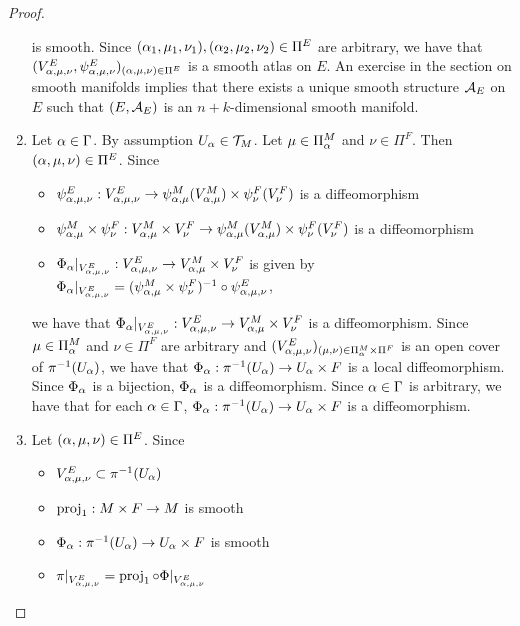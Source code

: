 \documentclass{book}
\begin{document}
\begin{proof}
\begin{enumerate}
			is smooth. Since $(\alpha_1, \mu_1, \nu_1), (\alpha_2, \mu_2, \nu_2) \in \Pi^E$ are arbitrary, we have that $(V^E_{\alpha, \mu, \nu}, \psi^E_{\alpha, \mu, \nu})_{(\alpha, \mu, \nu) \in \Pi^E}$ is a smooth atlas on $E$. An exercise in the section on smooth manifolds implies that there exists a unique smooth structure $\mathcal{A}_E$ on $E$ such that  $(E, \mathcal{A}_E)$ is an $n+k$-dimensional smooth manifold. 
			\item Let $\alpha \in \Gamma$. By assumption $U_{\alpha} \in \mathcal{T}_M$. Let $\mu \in \Pi^M_{\alpha}$ and $\nu \in \Pi^F$. Then $(\alpha, \mu, \nu) \in \Pi^E$. Since 
			\begin{itemize}
				\item $\psi^E_{\alpha, \mu, \nu}: V^E_{\alpha, \mu, \nu} \rightarrow \psi^M_{\alpha, \mu}(V^M_{\alpha, \mu}) \times \psi^F_{\nu}(V^F_{\nu})$ is a diffeomorphism
				\item $\psi^M_{\alpha, \mu} \times \psi^F_{\nu}: V^M_{\alpha, \mu} \times V^F_{\nu} \rightarrow \psi^M_{\alpha, \mu}(V^M_{\alpha, \mu}) \times \psi^F_{\nu}(V^F_{\nu})$ is a diffeomorphism  
				\item $\Phi_{\alpha}|_{V^E_{\alpha, \mu, \nu}}: V^E_{\alpha, \mu, \nu} \rightarrow V^M_{\alpha, \mu} \times V^F_{\nu}$ is given by 
				$\Phi_{\alpha}|_{V^E_{\alpha, \mu, \nu}} =  (\psi^M_{\alpha, \mu} \times \psi^F_{\nu})^{-1} \circ \psi^E_{\alpha, \mu, \nu}$,
			\end{itemize}
			we have that $\Phi_{\alpha}|_{V^E_{\alpha, \mu, \nu}}: V^E_{\alpha, \mu, \nu} \rightarrow V^M_{\alpha, \mu} \times V^F_{\nu}$ is a diffeomorphism. Since $\mu \in \Pi^M_{\alpha}$ and $\nu \in \Pi^F$ are arbitrary and $(V^E_{\alpha, \mu, \nu})_{(\mu, \nu) \in \Pi^M_{\alpha} \times \Pi^F}$ is an open cover of $\pi^{-1}(U_{\alpha})$, we have that $\Phi_{\alpha}: \pi^{-1}(U_{\alpha}) \rightarrow U_{\alpha} \times F$ is a local diffeomorphism. Since $\Phi_{\alpha}$ is a bijection, $\Phi_{\alpha}$ is a diffeomorphism. Since $\alpha \in \Gamma$ is arbitrary, we have that for each $\alpha \in \Gamma$, $\Phi_{\alpha}: \pi^{-1}(U_{\alpha}) \rightarrow U_{\alpha} \times F$ is a diffeomorphism.
			\item Let $(\alpha, \mu, \nu) \in \Pi^E$. Since 
			\begin{itemize}
				\item $V^E_{\alpha, \mu, \nu} \subset \pi^{-1}(U_{\alpha})$
				\item $\operatorname{\text{proj}}_1: M \times F \rightarrow M$ is smooth
				\item $\Phi_{\alpha}: \pi^{-1}(U_{\alpha}) \rightarrow U_{\alpha} \times F$ is smooth
				\item $\pi|_{V^E_{\alpha, \mu, \nu}} = \operatorname{\text{proj}}_1 \circ \Phi|_{V^E_{\alpha, \mu, \nu}}$

\end{itemize}
\end{enumerate}
\end{proof}
\end{document}
